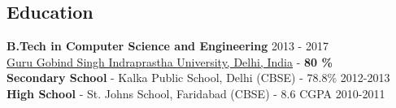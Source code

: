 \documentclass[margin, centered]{res}
\begin{document}
\begin{resume}

\section{Education}
\textbf{B.Tech in Computer Science and Engineering} \hfill 2013 - 2017 \\
\href{http://ipu.ac.in/}{Guru Gobind Singh Indraprastha University, Delhi, India} - \textbf{80 \%} \\ 
\textbf{Secondary School} - Kalka Public School, Delhi (CBSE) - 78.8\% \hfill 2012-2013\\
\textbf{High School} - St. Johns School, Faridabad (CBSE) - 8.6 CGPA \hfill 2010-2011
 

\end{resume}
\end{document}
